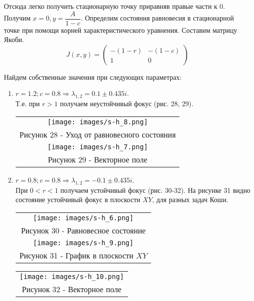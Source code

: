 Отсюда легко получить стационарную точку приравняв правые части к 0. Получим $x=0, y=\dfrac{A}{1-c}$.
Определим состояния равновесия в стационарной точке при помощи корней характеристического уравнения. Составим матрицу Якоби.
\begin{equation}
  J(x, y) = \begin{pmatrix}
    -(1-r)&-(1-c)\\1&0
  \end{pmatrix}
\end{equation}

Найдем собственные значения при следующих параметрах:
\begin{enumerate}
  \item $r=1.2;c=0.8\Rightarrow \lambda_{1,2}=0.1\pm 0.435 i$.\\ Т.е. при $r>1$ получаем неустойчивый фокус (рис. 28, 29).
  \begin{center}
    \begin{tabular}{c}
      \texttt{[image: images/s-h\_8.png]}\\
      Рисунок 28 - Уход от равновесного состояния\\
      \texttt{[image: images/s-h\_7.png]}\\
      Рисунок 29 - Векторное поле
    \end{tabular}
  \end{center}
  \item $r=0.8;c=0.8\Rightarrow \lambda_{1,2}=-0.1\pm 0.435 i$.\\ При $0<r<1$ получаем устойчивый фокус (рис. 30-32).
На рисунке 31 видно состояние устойчивый фокус в плоскости $XY$, для разных задач Коши.
  \begin{center}
    \begin{tabular}{c}
      \texttt{[image: images/s-h\_6.png]}\\
      Рисунок 30 - Равновесное состояние\\
      \texttt{[image: images/s-h\_9.png]}\\
      Рисунок 31 - График в плоскости $XY$
      \end{tabular}
    \end{center}
  \begin{center}
    \begin{tabular}{c}
      \texttt{[image: images/s-h\_10.png]}\\
      Рисунок 32 - Векторное поле
    \end{tabular}
  \end{center}

\end{enumerate}
